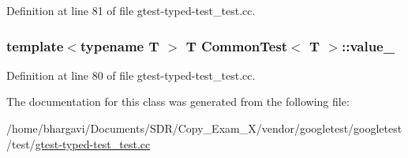 Definition at line 81 of file gtest-\/typed-\/test\+\_\+test.\+cc.

\subsubsection[{\texorpdfstring{value\+\_\+}{value_}}]{\setlength{\rightskip}{0pt plus 5cm}template$<$typename T $>$ {\bf T} {\bf Common\+Test}$<$ {\bf T} $>$\+::value\+\_\+\hspace{0.3cm}{\ttfamily [protected]}}\hypertarget{class_common_test_ae59c4abcb833625a7baeb2048531ebec}{}\label{class_common_test_ae59c4abcb833625a7baeb2048531ebec}


Definition at line 80 of file gtest-\/typed-\/test\+\_\+test.\+cc.



The documentation for this class was generated from the following file\+:\begin{DoxyCompactItemize}
\item 
/home/bhargavi/\+Documents/\+S\+D\+R/\+Copy\+\_\+\+Exam\+\_\+X/vendor/googletest/googletest/test/\hyperlink{gtest-typed-test__test_8cc}{gtest-\/typed-\/test\+\_\+test.\+cc}\end{DoxyCompactItemize}
